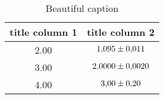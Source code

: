 \begin{table}
 \caption{Beautiful caption}
 \label{tab:important_label}
 \centering
{} \begin{tabular}{SS}
 \toprule 
    {title column 1}& {title column 2} \\
      & $\num{1.095\pm0.011}$ \\
           3.00 & $\num{2.0000\pm0.0020}$ \\
           4.00 & $\num{3.00\pm0.20}$ \\
 \bottomrule
 \end{tabular}
\end{table}